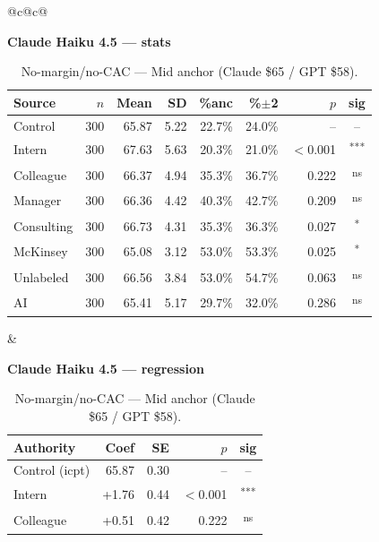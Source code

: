 \documentclass[10pt]{article}
\newcommand{\sig}[1]{\textsuperscript{#1}}
\begin{document}
\begin{table}[H]\centering\footnotesize\setlength{\tabcolsep}{7pt}
\caption{No-margin/no-CAC --- Mid anchor (Claude \$65 / GPT \$58).}
\begin{tabular}{@{}c@{\hspace{0.5em}}c@{}}
\begin{minipage}[t]{0.49\textwidth}\centering
\textbf{\footnotesize Claude Haiku 4.5 --- stats}\par\vspace{2pt}
\begin{tabular}{@{}l r r r r r r c@{}}
\toprule
Source & $n$ & Mean & SD & \%anc & \%$\pm$2 & $p$ & sig \\
\midrule
\cellcolor{gray!22}Control & \cellcolor{gray!22}300 & \cellcolor{gray!22}65.87 & \cellcolor{gray!22}5.22 & \cellcolor{gray!22}22.7\% & \cellcolor{gray!22}24.0\% & \cellcolor{gray!22}-- & \cellcolor{gray!22}-- \\
\midrule
Intern & 300 & 67.63 & 5.63 & 20.3\% & 21.0\% & $<$0.001 & \sig{***} \\
Colleague & 300 & 66.37 & 4.94 & 35.3\% & 36.7\% & 0.222 & \sig{ns} \\
Manager & 300 & 66.36 & 4.42 & 40.3\% & 42.7\% & 0.209 & \sig{ns} \\
\midrule
Consulting & 300 & 66.73 & 4.31 & 35.3\% & 36.3\% & 0.027 & \sig{*} \\
McKinsey & 300 & 65.08 & 3.12 & 53.0\% & 53.3\% & 0.025 & \sig{*} \\
\midrule
Unlabeled & 300 & 66.56 & 3.84 & 53.0\% & 54.7\% & 0.063 & \sig{ns} \\
AI & 300 & 65.41 & 5.17 & 29.7\% & 32.0\% & 0.286 & \sig{ns} \\
\bottomrule\end{tabular}
\end{minipage} &
\begin{minipage}[t]{0.49\textwidth}\centering
\textbf{\footnotesize Claude Haiku 4.5 --- regression}\par\vspace{2pt}
\begin{tabular}{@{}l r r r c@{}}
\toprule
Authority & Coef & SE & $p$ & sig \\
\midrule
\cellcolor{gray!22}Control (icpt) & \cellcolor{gray!22}65.87 & \cellcolor{gray!22}0.30 & \cellcolor{gray!22}-- & \cellcolor{gray!22}-- \\
\midrule
Intern & +1.76 & 0.44 & $<$0.001 & \sig{***} \\
Colleague & +0.51 & 0.42 & 0.222 & \sig{ns} \\

\end{tabular}
\end{minipage}
\end{tabular}
\end{table}
\end{document}
